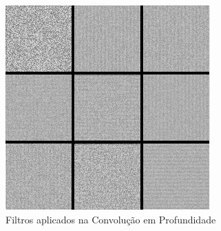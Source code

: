 \documentclass{bmvc2k}
\begin{document}
\begin{figure}[ht]
\centering
\includegraphics[scale=0.5]{imagens/stitched_filters_3x3.png} 
\caption{Filtros aplicados na Convolução em Profundidade}
\end{figure}

\newpage
\end{document}
